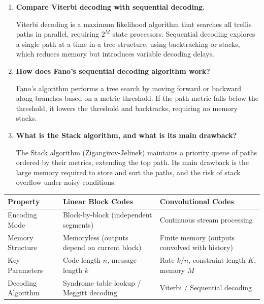 \documentclass[12pt,a4paper]{article}
\newcommand{\Q}[1]{\textbf{#1}\par\noindent\ignorespaces}
\renewcommand{\arraystretch}{1.45}
\begin{document}
\begin{tcolorbox}[exambox, title={\textbf{Frequently Asked / Viva Questions}}]
\begin{enumerate}[topsep=0pt, label=\textbf{Q\arabic*.}, itemsep=5pt]
  \item \Q{Compare Viterbi decoding with sequential decoding.}
    Viterbi decoding is a maximum likelihood algorithm that searches all trellis paths in parallel, requiring $2^M$ state processors. Sequential decoding explores a single path at a time in a tree structure, using backtracking or stacks, which reduces memory but introduces variable decoding delays.
  \item \Q{How does Fano's sequential decoding algorithm work?}
    Fano's algorithm performs a tree search by moving forward or backward along branches based on a metric threshold. If the path metric falls below the threshold, it lowers the threshold and backtracks, requiring no memory stacks.
  \item \Q{What is the Stack algorithm, and what is its main drawback?}
    The Stack algorithm (Zigangirov-Jelinek) maintains a priority queue of paths ordered by their metrics, extending the top path. Its main drawback is the large memory required to store and sort the paths, and the risk of stack overflow under noisy conditions.
\end{enumerate}
\end{tcolorbox}

\vspace{6pt}

\begin{tcolorbox}[tikzbox, title={\textbf{Structural Comparison of Block and Convolutional Codes}}]
\renewcommand{\arraystretch}{1.45}
\begin{tabularx}{\linewidth}{|B{3.2cm}|Y|Y|}
\hline
\textbf{Property} & \textbf{Linear Block Codes} & \textbf{Convolutional Codes} \\
\hline
Encoding Mode & Block-by-block (independent segments) & Continuous stream processing \\
\hline
Memory Structure & Memoryless (outputs depend on current block) & Finite memory (outputs convolved with history) \\
\hline
Key Parameters & Code length $n$, message length $k$ & Rate $k/n$, constraint length $K$, memory $M$ \\
\hline
Decoding Algorithm & Syndrome table lookup / Meggitt decoding & Viterbi / Sequential decoding \\
\hline
\end{tabularx}
\end{tcolorbox}

\vspace{6pt}
\end{document}

